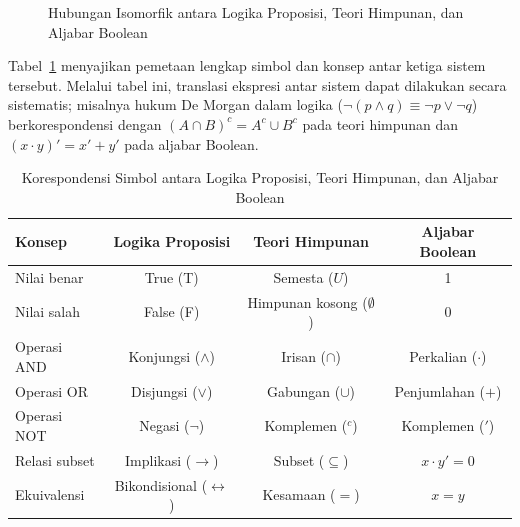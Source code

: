 \begin{figure}[H]
\centering
{}
\caption{Hubungan Isomorfik antara Logika Proposisi, Teori Himpunan, dan Aljabar Boolean}
\label{fig:isomorfik}
\end{figure}

Tabel~\ref{tab:korespondensi-tiga-sistem} menyajikan pemetaan lengkap simbol dan konsep antar ketiga sistem tersebut. Melalui tabel ini, translasi ekspresi antar sistem dapat dilakukan secara sistematis; misalnya hukum De Morgan dalam logika ($\neg(p \wedge q) \equiv \neg p \vee \neg q$) berkorespondensi dengan $(A \cap B)^c = A^c \cup B^c$ pada teori himpunan dan $(x \cdot y)' = x' + y'$ pada aljabar Boolean.

\begin{table}[H]
\centering
\renewcommand{\arraystretch}{1.3}
\begin{tabular}{|l|c|c|c|}
\hline
\textbf{Konsep} & \textbf{Logika Proposisi} & \textbf{Teori Himpunan} & \textbf{Aljabar Boolean} \\ \hline
Nilai benar & True (T) & Semesta ($U$) & 1 \\ \hline
Nilai salah & False (F) & Himpunan kosong ($\emptyset$) & 0 \\ \hline
Operasi AND & Konjungsi ($\wedge$) & Irisan ($\cap$) & Perkalian ($\cdot$) \\ \hline
Operasi OR & Disjungsi ($\vee$) & Gabungan ($\cup$) & Penjumlahan ($+$) \\ \hline
Operasi NOT & Negasi ($\neg$) & Komplemen ($^c$) & Komplemen ($'$) \\ \hline
Relasi subset & Implikasi ($\rightarrow$) & Subset ($\subseteq$) & $x \cdot y' = 0$ \\ \hline
Ekuivalensi & Bikondisional ($\leftrightarrow$) & Kesamaan ($=$) & $x = y$ \\ \hline
\end{tabular}
\caption{Korespondensi Simbol antara Logika Proposisi, Teori Himpunan, dan Aljabar Boolean}
\label{tab:korespondensi-tiga-sistem}
\end{table}


